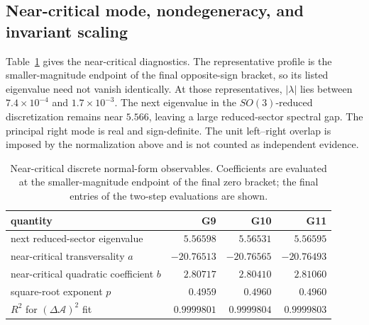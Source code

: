 \documentclass[11pt]{article}
\begin{document}
\subsection{Near-critical mode, nondegeneracy, and invariant scaling}

Table~\ref{tab:critical-structure} gives the near-critical diagnostics.  The
representative profile is the smaller-magnitude endpoint of the final
opposite-sign bracket, so its listed eigenvalue need not vanish identically.
At those representatives, $|\lambda|$ lies between
$7.4\times10^{-4}$ and $1.7\times10^{-3}$.  The next eigenvalue in the
$SO(3)$-reduced discretization remains near $5.566$, leaving a large
reduced-sector spectral gap.  The principal right mode is real and
sign-definite.  The unit left--right overlap is imposed by the normalization
above and is not counted as independent evidence.

\begin{table}[t]
\centering
\caption{Near-critical discrete normal-form observables.  Coefficients are
evaluated at the smaller-magnitude endpoint of the final zero bracket; the
final entries of the two-step evaluations are shown.}
\label{tab:critical-structure}
\begin{tabular}{@{}lrrr@{}}
\toprule
quantity & G9 & G10 & G11 \\
\midrule
next reduced-sector eigenvalue & $5.56598$ & $5.56531$ & $5.56595$ \\
near-critical transversality $a$ & $-20.76513$ & $-20.76565$ & $-20.76493$ \\
near-critical quadratic coefficient $b$ & $2.80717$ & $2.80410$ & $2.81060$ \\
square-root exponent $p$ & $0.4959$ & $0.4960$ & $0.4960$ \\
$R^2$ for $(\Delta\mathcal A)^2$ fit & $0.9999801$ & $0.9999804$ & $0.9999803$ \\
\bottomrule
\end{tabular}
\end{table}
\end{document}
